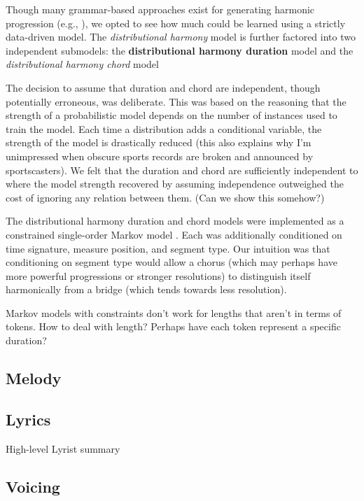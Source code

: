\documentclass[letterpaper]{article}
\begin{document}
Though many grammar-based approaches exist for generating harmonic progression (e.g., \cite{steedman1984generative}), we opted to see how much could be learned using a strictly data-driven model. The \textit{distributional harmony} model is further factored into two independent submodels: the \textbf{distributional harmony duration} model and the \textit{distributional harmony chord} model

The decision to assume that duration and chord are independent, though potentially erroneous, was deliberate. This was based on the reasoning that the strength of a probabilistic model depends on the number of instances used to train the model. Each time a distribution adds a conditional variable, the strength of the model is drastically reduced (this also explains why I'm unimpressed when obscure sports records are broken and announced by sportscasters). We felt that the duration and chord are sufficiently independent to where the model strength recovered by assuming independence outweighed the cost of ignoring any relation between them. (Can we show this somehow?)

The distributional harmony duration and chord models were implemented as a constrained single-order Markov model \cite{pachet2001finite}. Each was additionally conditioned on time signature, measure position, and segment type. Our intuition was that conditioning on segment type would allow a chorus (which may perhaps have more powerful progressions or stronger resolutions) to distinguish itself harmonically from a bridge (which tends towards less resolution).

Markov models with constraints don't work for lengths that aren't in terms of tokens. How to deal with length? Perhaps have each token represent a specific duration?

\subsection{Melody}



\subsection{Lyrics}

High-level Lyrist summary

\subsection{Voicing}
\end{document}
